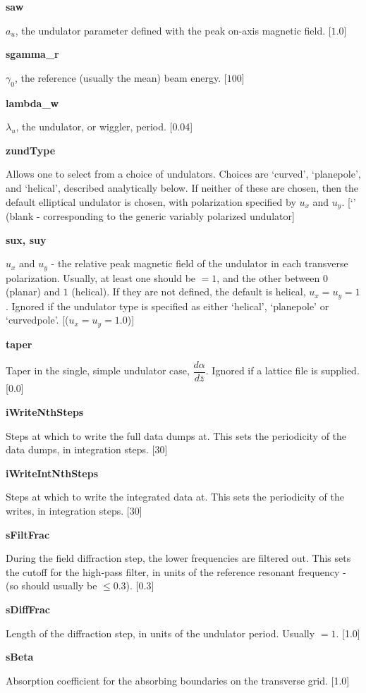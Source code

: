 \documentclass[12pt]{article}%
\begin{document}
{\bf saw}

$a_u$, the undulator parameter defined with the peak on-axis magnetic field. [$1.0$]

{\bf sgamma\_r}

$\gamma_0$, the reference (usually the mean) beam energy. [$100$]

{\bf lambda\_w}

$\lambda_u$, the undulator, or wiggler, period. [0.04]

{\bf zundType}

Allows one to select from a choice of undulators. Choices are `curved', `planepole', and `helical', described analytically below. If neither of these are chosen, then the default elliptical undulator is chosen, with polarization specified by $u_x$ and $u_y$. [`' (blank - corresponding to the generic variably polarized undulator]

{\bf sux, suy}

$u_x$ and $u_y$ - the relative peak magnetic field of the undulator in each transverse polarization. Usually, at least one should be $=1$, and the other between $0$ (planar) and $1$ (helical). If they are not defined, the default is helical, $u_x=u_y=1$. Ignored if the undulator type is specified as either `helical', `planepole' or `curvedpole'. [($u_x = u_y = 1.0$)]

{\bf taper}

Taper in the single, simple undulator case, $\dfrac{d\alpha}{d \bar{z}}$. Ignored if a lattice file is supplied. [$0.0$]

{\bf iWriteNthSteps}

Steps at which to write the full data dumps at. This sets the periodicity of the data dumps, in integration steps. [$30$]

{\bf iWriteIntNthSteps}

Steps at which to write the integrated data at. This sets the periodicity of the writes, in integration steps. [$30$]

{\bf sFiltFrac}

During the field diffraction step, the lower frequencies are filtered out. This sets the cutoff for the high-pass filter, in units of the reference resonant frequency - (so should usually be $\leq 0.3$). [0.3]

{\bf sDiffFrac}

Length of the diffraction step, in units of the undulator period. Usually $=1$. [1.0]

{\bf sBeta}

Absorption coefficient for the absorbing boundaries on the transverse grid. [1.0]
\end{document}
